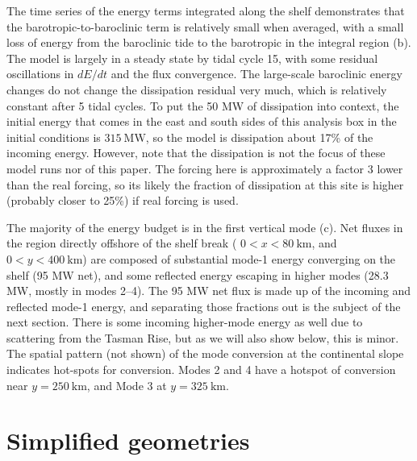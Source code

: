 \documentclass[10pt]{article}
\begin{document}
The time series of the energy terms integrated along the shelf demonstrates that the barotropic-to-baroclinic term is relatively small when averaged, with a small loss of energy from the baroclinic tide to the barotropic in the integral region (b).  The model is largely in a steady state by tidal cycle 15, with some residual oscillations in $dE/dt$ and the flux convergence.  The large-scale baroclinic energy changes do not change the dissipation residual very much, which is relatively constant after 5 tidal cycles.  To put the 50 MW of dissipation into context, the initial energy that comes in the east and south sides of this analysis box in the initial conditions is $315\ \mathrm{MW}$, so the model is dissipation about 17\% of the incoming energy.  However, note that the dissipation is not the focus of these model runs nor of this paper. The forcing here is approximately a factor 3 lower than the real forcing, so its likely the fraction of dissipation at this site is higher (probably closer to 25\%) if real forcing is used.  

The majority of the energy budget is in the first vertical mode (c).  Net fluxes in the region directly offshore of the shelf break ( $0<x<80\ \mathrm{km}$, and $0<y<400\ \mathrm{km}$) are composed of substantial mode-1 energy converging on the shelf (95 MW net), and some reflected energy escaping in higher modes (28.3 MW, mostly in modes 2--4).  The 95 MW net flux is made up of the incoming and reflected mode-1 energy, and separating those fractions out is the subject of the next section.  There is some incoming higher-mode energy as well due to scattering from the Tasman Rise, but as we will also show below, this is minor.  The spatial pattern (not shown) of the mode conversion at the continental slope indicates hot-spots for conversion.  Modes 2 and 4 have a hotspot of conversion near $y=250\ \mathrm{km}$, and Mode 3 at $y=325\ \mathrm{km}$.  

\section{Simplified geometries}
\label{sec:Simplified}
\end{document}
